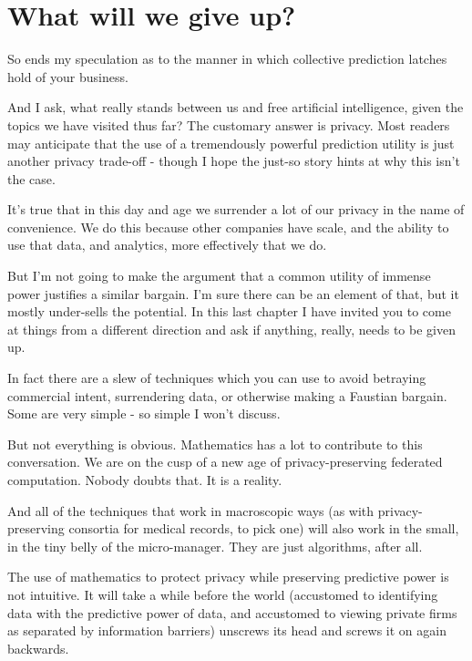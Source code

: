 





\section{What will we give up?}

So ends my speculation as to the manner in which collective prediction latches hold of your business. 

And I ask, what really stands between us and free artificial intelligence, given the topics we have visited thus far? The customary answer is privacy. Most readers may anticipate that the use of a tremendously powerful prediction utility is just another privacy trade-off - though I hope the just-so story hints at why this isn't the case.  

It's true that in this day and age we surrender a lot of our privacy in the name of convenience. We do this because other companies have scale, and the ability to use that data, and analytics, more effectively that we do. 

But I'm not going to make the argument that a common utility of immense power justifies a similar bargain. I'm sure there can be an element of that, but it mostly under-sells the potential. In this last chapter I have invited you to come at things from a different direction and ask if anything, really, needs to be given up. 
 
In fact there are a slew of techniques which you can use to avoid betraying commercial intent, surrendering data, or otherwise making a Faustian bargain. Some are very simple - so simple I won't discuss. 

But not everything is obvious. Mathematics has a lot to contribute to this conversation. We are on the cusp of a new age of privacy-preserving federated computation. Nobody doubts that. It is a reality. 

And all of the techniques that work in macroscopic ways (as with privacy-preserving consortia for medical records, to pick one) will also work in the small, in the tiny belly of the micro-manager. They are just algorithms, after all. 

The use of mathematics to protect privacy while preserving predictive power is not intuitive. It will take a while before the world (accustomed to identifying data with the predictive power of data, and accustomed to viewing private firms as separated by information barriers) unscrews its head and screws it on again backwards. 

